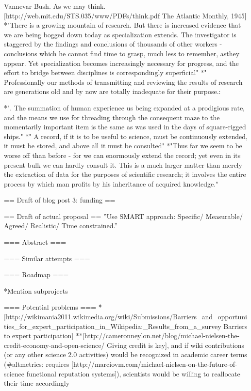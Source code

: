 Vannevar Bush. As we may think. [http://web.mit.edu/STS.035/www/PDFs/think.pdf The Atlantic Monthly, 1945]
*"There is a growing mountain of research. But there is increased evidence that we are being bogged down today as specialization extends. The investigator is staggered by the findings and conclusions of thousands of other workers - conclusions which he cannot find time to grasp, much less to remember, asthey appear. Yet specialization becomes increasingly necessary for progress, and the effort to bridge between disciplines is correspondingly superficial"
*"
Professionally our methods of transmitting and reviewing the results of research are generations old and
by now are totally inadequate for their purpose.:

*". The summation of human experience us being expanded at a prodigious rate, and
the means we use for threading through the consequent maze to the momentarily important item is the
same as was used in the days of square-rigged ships."
*"
A record, if it is to be useful to science, must be continuously extended, it must be stored, and above all it
must be consulted"
*"Thus far we seem to be worse
off than before - for we can enormously extend the record; yet even in its present bulk we can hardly
consult it. This is a much larger matter than merely the extraction of data for the purposes of scientific
research; it involves the entire process by which man profits by his inheritance of acquired knowledge."

== Draft of blog post 3: funding ==

== Draft of actual proposal ==
''Use SMART approach: Specific/ 
Measurable/ 
Agreed/ 
Realistic/ 
Time constrained.''

=== Abstract ===

=== Similar attempts ===

=== Roadmap ===

*Mention subprojects

=== Potential problems ===
*[http://wikimania2011.wikimedia.org/wiki/Submissions/Barriers_and_opportunities_for_expert_participation_in_Wikipedia:_Results_from_a_survey Barriers to expert participation]
**[http://cameronneylon.net/blog/michael-nielsen-the-credit-economy-and-open-science/ Giving credit is key], and if wiki contributions (or any other science 2.0 activities) would be recognized in academic career terms (#altmetrics; requires [http://marciovm.com/michael-nielsen-on-the-future-of-science functional reputation systems]), scientists would be willing to reallocate their time accordingly


